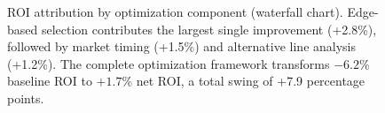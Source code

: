 \begin{figure}[htbp]
\caption[Profit optimization ROI attribution]{ROI attribution by optimization component (waterfall chart). Edge-based selection contributes the largest single improvement (+2.8\%), followed by market timing (+1.5\%) and alternative line analysis (+1.2\%). The complete optimization framework transforms $-6.2\%$ baseline ROI to $+1.7\%$ net ROI, a total swing of +7.9 percentage points.}
\label{fig:profit-attribution-chart}
\end{figure}

